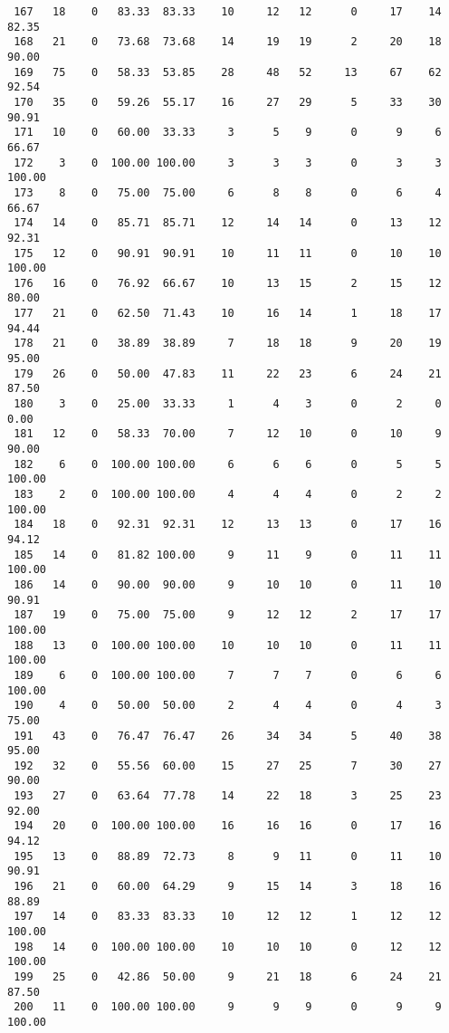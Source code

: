 \begin{verbatim}
 167   18    0   83.33  83.33    10     12   12      0     17    14    82.35
 168   21    0   73.68  73.68    14     19   19      2     20    18    90.00
 169   75    0   58.33  53.85    28     48   52     13     67    62    92.54
 170   35    0   59.26  55.17    16     27   29      5     33    30    90.91
 171   10    0   60.00  33.33     3      5    9      0      9     6    66.67
 172    3    0  100.00 100.00     3      3    3      0      3     3   100.00
 173    8    0   75.00  75.00     6      8    8      0      6     4    66.67
 174   14    0   85.71  85.71    12     14   14      0     13    12    92.31
 175   12    0   90.91  90.91    10     11   11      0     10    10   100.00
 176   16    0   76.92  66.67    10     13   15      2     15    12    80.00
 177   21    0   62.50  71.43    10     16   14      1     18    17    94.44
 178   21    0   38.89  38.89     7     18   18      9     20    19    95.00
 179   26    0   50.00  47.83    11     22   23      6     24    21    87.50
 180    3    0   25.00  33.33     1      4    3      0      2     0     0.00
 181   12    0   58.33  70.00     7     12   10      0     10     9    90.00
 182    6    0  100.00 100.00     6      6    6      0      5     5   100.00
 183    2    0  100.00 100.00     4      4    4      0      2     2   100.00
 184   18    0   92.31  92.31    12     13   13      0     17    16    94.12
 185   14    0   81.82 100.00     9     11    9      0     11    11   100.00
 186   14    0   90.00  90.00     9     10   10      0     11    10    90.91
 187   19    0   75.00  75.00     9     12   12      2     17    17   100.00
 188   13    0  100.00 100.00    10     10   10      0     11    11   100.00
 189    6    0  100.00 100.00     7      7    7      0      6     6   100.00
 190    4    0   50.00  50.00     2      4    4      0      4     3    75.00
 191   43    0   76.47  76.47    26     34   34      5     40    38    95.00
 192   32    0   55.56  60.00    15     27   25      7     30    27    90.00
 193   27    0   63.64  77.78    14     22   18      3     25    23    92.00
 194   20    0  100.00 100.00    16     16   16      0     17    16    94.12
 195   13    0   88.89  72.73     8      9   11      0     11    10    90.91
 196   21    0   60.00  64.29     9     15   14      3     18    16    88.89
 197   14    0   83.33  83.33    10     12   12      1     12    12   100.00
 198   14    0  100.00 100.00    10     10   10      0     12    12   100.00
 199   25    0   42.86  50.00     9     21   18      6     24    21    87.50
 200   11    0  100.00 100.00     9      9    9      0      9     9   100.00

\end{verbatim}
